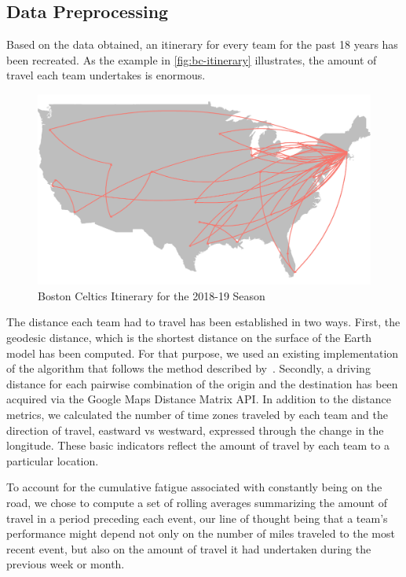 \documentclass[
    12pt,
    a4paper,
    titlepage,  %
    abstract,  %
    headings=standardclasses,  %
    bibliography=totocnumbered  %
]{scrartcl}
\begin{document}
\subsection{Data Preprocessing}

Based on the data obtained, an itinerary for every team for the past 18 years has been recreated. As the example in \autoref{fig:bc-itinerary} illustrates, the amount of travel each team undertakes is enormous.

\begin{figure}[ht]
    \centering
    \includegraphics[width=0.95\linewidth]{bc-itinerary}
    \caption{Boston Celtics Itinerary for the 2018-19 Season}
    \label{fig:bc-itinerary}
\end{figure}

The distance each team had to travel has been established in two ways. First, the geodesic distance, which is the shortest distance on the surface of the Earth model has been computed. For that purpose, we used an existing implementation of the algorithm that follows the method described by~\cite{karney}. Secondly, a driving distance for each pairwise combination of the origin and the destination has been acquired via the Google Maps Distance Matrix API. In addition to the distance metrics, we calculated the number of time zones traveled by each team and the direction of travel, eastward vs westward, expressed through the change in the longitude. These basic indicators reflect the amount of travel by each team to a particular location.

To account for the cumulative fatigue associated with constantly being on the road, we chose to compute a set of rolling averages summarizing the amount of travel in a period preceding each event, our line of thought being that a team's performance might depend not only on the number of miles traveled to the most recent event, but also on the amount of travel it had undertaken during the previous week or month.
\end{document}
